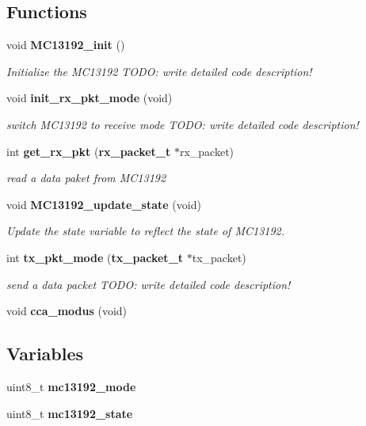 \subsection*{Functions}
\begin{CompactItemize}
\item 
void {\bf MC13192\_\-init} ()
\begin{CompactList}\small\item\em Initialize the MC13192 TODO: write detailed code description! \item\end{CompactList}\item 
void {\bf init\_\-rx\_\-pkt\_\-mode} (void)
\begin{CompactList}\small\item\em switch MC13192 to receive mode TODO: write detailed code description! \item\end{CompactList}\item 
int {\bf get\_\-rx\_\-pkt} ({\bf rx\_\-packet\_\-t} $\ast$rx\_\-packet)
\begin{CompactList}\small\item\em read a data paket from MC13192 \item\end{CompactList}\item 
void {\bf MC13192\_\-update\_\-state} (void)
\begin{CompactList}\small\item\em Update the state variable to reflect the state of MC13192. \item\end{CompactList}\item 
int {\bf tx\_\-pkt\_\-mode} ({\bf tx\_\-packet\_\-t} $\ast$tx\_\-packet)
\begin{CompactList}\small\item\em send a data packet TODO: write detailed code description! \item\end{CompactList}\item 
void {\bf cca\_\-modus} (void)
\end{CompactItemize}
\subsection*{Variables}
\begin{CompactItemize}
\item 
uint8\_\-t {\bf mc13192\_\-mode}
\item 
uint8\_\-t {\bf mc13192\_\-state}
\end{CompactItemize}
